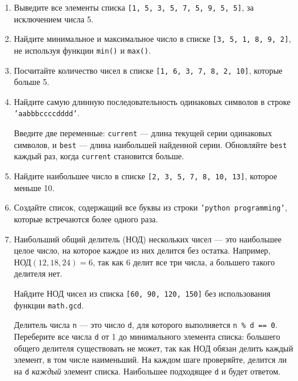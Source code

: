 \documentclass[a4,12pt]{article}
\theoremstyle{remark}
\begin{document}
\begin{enumerate}
    \subsection*{Продвинутый уровень}
    \item Выведите все элементы списка \texttt{[1, 5, 3, 5, 7, 5, 9, 5, 5]}, за исключением числа 5.
    \item Найдите минимальное и максимальное число в списке \texttt{[3, 5, 1, 8, 9, 2]}, не используя функции \texttt{min()} и \texttt{max()}.
    \item Посчитайте количество чисел в списке \texttt{[1, 6, 3, 7, 8, 2, 10]}, которые больше 5.

    \item Найдите самую длинную последовательность одинаковых символов в строке \texttt{'aabbbccccdddd'}.

    \begin{exercisehint}
        Введите две переменные: \texttt{current} — длина текущей серии одинаковых
        символов, и \texttt{best} — длина наибольшей найденной серии. Обновляйте
        \texttt{best} каждый раз, когда \texttt{current} становится больше.
    \end{exercisehint}

    \item Найдите наибольшее число в списке \texttt{[2, 3, 5, 7, 8, 10, 13]}, которое меньше 10.
    \item Создайте список, содержащий все буквы из строки \texttt{'python programming'}, которые встречаются более одного раза.

    \item Наибольший общий делитель (НОД) нескольких чисел --- это наибольшее целое число, на которое каждое из них делится без остатка.
Например, $\text{НОД}(12, 18, 24) = 6$, так как 6 делит все три числа, а большего такого делителя нет.

Найдите НОД чисел из списка \texttt{[60, 90, 120, 150]} без использования функции \texttt{math.gcd}.

\begin{exercisehint}
    Делитель числа \texttt{n} --- это число \texttt{d}, для которого
    выполняется \texttt{n \% d == 0}.
    Переберите все числа \texttt{d} от 1 до минимального элемента списка:
    большего общего делителя существовать не может, так как НОД обязан
    делить каждый элемент, в том числе наименьший.
    На каждом шаге проверяйте, делится ли на \texttt{d} \emph{каждый}
    элемент списка. Наибольшее подходящее \texttt{d} и будет ответом.
\end{exercisehint}



\end{enumerate}
\end{document}
